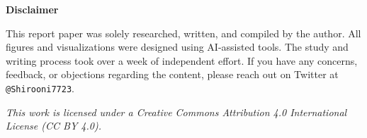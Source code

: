 \documentclass[10pt,a4paper]{article}
\begin{document}
\thispagestyle{plain}
\vspace*{3cm} %

\begin{center}
    \textbf{Disclaimer}
\end{center}

\noindent
This report paper was solely researched, written, and compiled by the author. 
All figures and visualizations were designed using AI-assisted tools. 
The study and writing process took over a week of independent effort. 
If you have any concerns, feedback, or objections regarding the content, 
please reach out on Twitter at \texttt{@Shirooni7723}.


\vspace{1cm}
\begin{center}
    \textit{This work is licensed under a Creative Commons Attribution 4.0 International License (CC BY 4.0).}
\end{center}
\end{document}
